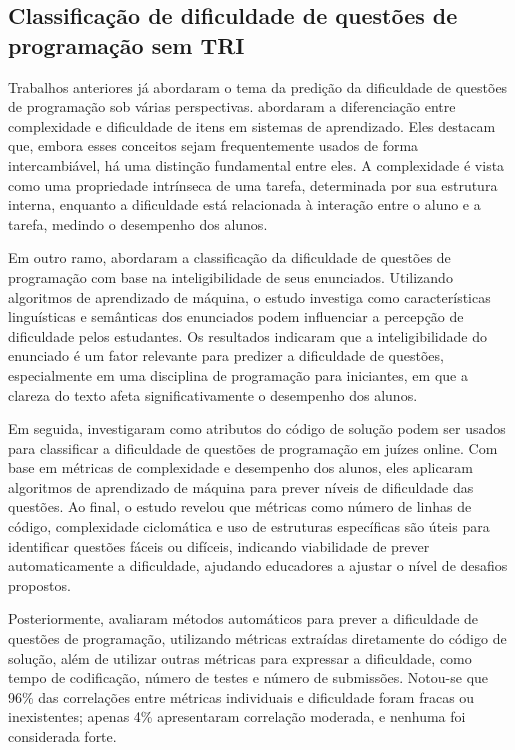 \documentclass[12pt]{article}
\begin{document}
\subsection{Classificação de dificuldade de questões de programação sem TRI} \label{sec:revlit:dificuldade}

Trabalhos anteriores já abordaram o tema da predição da dificuldade de questões de programação sob várias perspectivas. \cite{pelanek2022complexity} abordaram a diferenciação entre complexidade e dificuldade de itens em sistemas de aprendizado. %
Eles destacam que, embora esses conceitos sejam frequentemente usados de forma intercambiável, há uma distinção fundamental entre eles. A complexidade é vista como uma propriedade intrínseca de uma tarefa, determinada por sua estrutura interna, enquanto a dificuldade está relacionada à interação entre o aluno e a tarefa, medindo o desempenho dos alunos.

Em outro ramo, \cite{santos2019} abordaram a classificação da dificuldade de questões de programação com base na inteligibilidade de seus enunciados. Utilizando algoritmos de aprendizado de máquina, o estudo investiga como características linguísticas e semânticas dos enunciados podem influenciar a percepção de dificuldade pelos estudantes. Os resultados indicaram que a inteligibilidade do enunciado é um fator relevante para predizer a dificuldade de questões, especialmente em uma disciplina de programação para iniciantes, em que a clareza do texto afeta significativamente o desempenho dos alunos.

Em seguida, \cite{marcos2021} investigaram como atributos do código de solução podem ser usados para classificar a dificuldade de questões de programação em juízes online. Com base em métricas de complexidade e desempenho dos alunos, eles aplicaram algoritmos de aprendizado de máquina para prever níveis de dificuldade das questões. Ao final, o estudo revelou que métricas como número de linhas de código, complexidade ciclomática e uso de estruturas específicas são úteis para identificar questões fáceis ou difíceis, indicando viabilidade de prever automaticamente a dificuldade, ajudando educadores a ajustar o nível de desafios propostos.

Posteriormente, \cite{elrik2022} avaliaram métodos automáticos para prever a dificuldade de questões de programação, utilizando métricas extraídas diretamente do código de solução, além de utilizar outras métricas para expressar a dificuldade, como tempo de codificação, número de testes e número de submissões. Notou-se que 96\% das correlações entre métricas individuais e dificuldade foram fracas ou inexistentes; apenas 4\% apresentaram correlação moderada, e nenhuma foi considerada forte.
\end{document}
